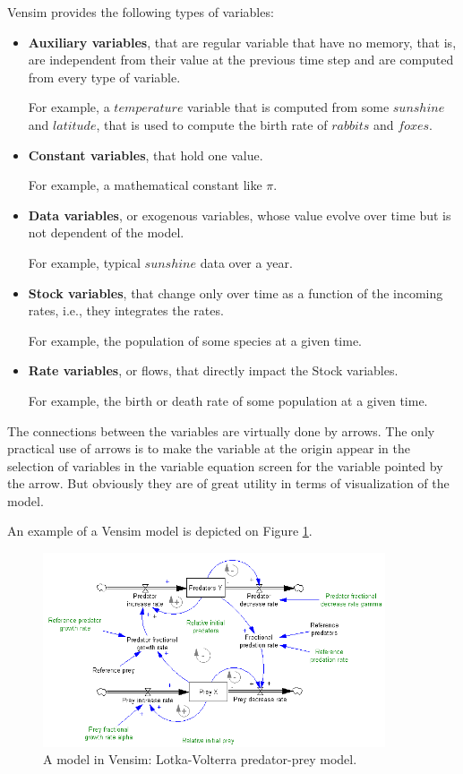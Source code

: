 Vensim provides the following types of variables:
\begin{itemize}
    \item \textbf{Auxiliary variables}, that are regular variable that have no memory, that is, are independent from their value at the previous time step and are computed from every type of variable.

    For example, a $temperature$ variable that is computed from some $sunshine$ and $latitude$, that is used to compute the birth rate of $rabbits$ and $foxes$.

    \item \textbf{Constant variables}, that hold one value.
    
    For example, a mathematical constant like $\pi$.

    \item \textbf{Data variables}, or exogenous variables, whose value evolve over time but is not dependent of the model.

    For example, typical $sunshine$ data over a year.

    \item \textbf{Stock variables}, that change only over time as a function of the incoming rates, i.e., they integrates the rates.

    For example, the population of some species at a given time.

    \item \textbf{Rate variables}, or flows, that directly impact the Stock variables. 

    For example, the birth or death rate of some population at a given time.
\end{itemize}

The connections between the variables are virtually done by arrows. The only practical use of arrows is to make the variable at the origin appear in the selection of variables in the variable equation screen for the variable pointed by the arrow. But obviously they are of great utility in terms of visualization of the model.

An example of a Vensim model is depicted on Figure \ref{fig:vensim-model-example}.

\begin{figure}[h!]
    \includegraphics[width=0.9\textwidth]{resources/images/vensim-model-example.png}
    \caption{A model in Vensim: Lotka-Volterra predator-prey model.}
    \label{fig:vensim-model-example}
\end{figure}


